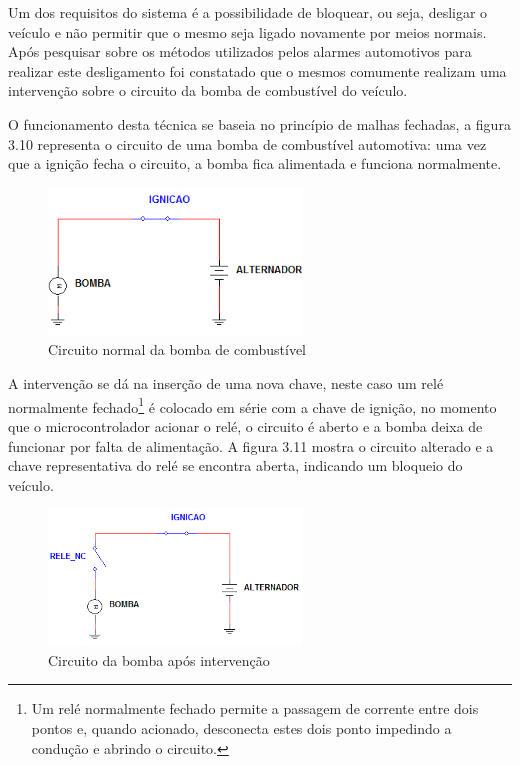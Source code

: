 Um dos requisitos do sistema é a possibilidade de bloquear, ou seja, desligar o veículo e não permitir que o mesmo seja ligado novamente por meios normais. Após pesquisar sobre os métodos utilizados pelos alarmes automotivos para realizar este desligamento foi constatado que o mesmos comumente realizam uma intervenção sobre o circuito da bomba de combustível do veículo.

O funcionamento desta técnica se baseia no princípio de malhas fechadas, a figura 3.10 representa o circuito de uma bomba de combustível automotiva: uma vez que a ignição fecha o circuito, a bomba fica alimentada e funciona normalmente.

 \begin{figure}[!htb]
\centering
\includegraphics[width=0.6\textwidth]{figures/circBomba.png}
\caption{Circuito normal da bomba de combustível}
\label{1}
\end{figure}

A intervenção se dá na inserção de uma nova chave, neste caso um relé normalmente fechado\footnote{Um relé normalmente fechado permite a passagem de corrente entre dois pontos e, quando acionado, desconecta estes dois ponto impedindo a condução e abrindo o circuito.} é colocado em série com a chave de ignição, no momento que o microcontrolador acionar o relé, o circuito é aberto e a bomba deixa de funcionar por falta de alimentação. A figura 3.11 mostra o circuito alterado e a chave representativa do relé se encontra aberta, indicando um bloqueio do veículo.

\begin{figure}[!htb]
\centering
\includegraphics[width=0.6\textwidth]{figures/circBombaFin.png}
\caption{Circuito da bomba após intervenção}
\label{1}
\end{figure}

